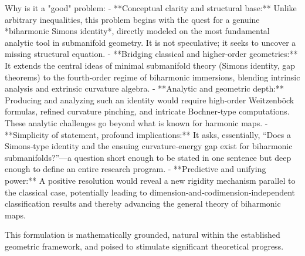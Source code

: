 Why is it a "good" problem:  
- **Conceptual clarity and structural base:** Unlike arbitrary inequalities, this problem begins with the quest for a genuine *biharmonic Simons identity*, directly modeled on the most fundamental analytic tool in submanifold geometry. It is not speculative; it seeks to uncover a missing structural equation.  
- **Bridging classical and higher‑order geometries:** It extends the central ideas of minimal submanifold theory (Simons identity, gap theorems) to the fourth‑order regime of biharmonic immersions, blending intrinsic analysis and extrinsic curvature algebra.  
- **Analytic and geometric depth:** Producing and analyzing such an identity would require high‑order Weitzenböck formulas, refined curvature pinching, and intricate Bochner‑type computations. These analytic challenges go beyond what is known for harmonic maps.  
- **Simplicity of statement, profound implications:** It asks, essentially, “Does a Simons‑type identity and the ensuing curvature‑energy gap exist for biharmonic submanifolds?”—a question short enough to be stated in one sentence but deep enough to define an entire research program.  
- **Predictive and unifying power:** A positive resolution would reveal a new rigidity mechanism parallel to the classical case, potentially leading to dimension‑and‑codimension‑independent classification results and thereby advancing the general theory of biharmonic maps.  

This formulation is mathematically grounded, natural within the established geometric framework, and poised to stimulate significant theoretical progress.